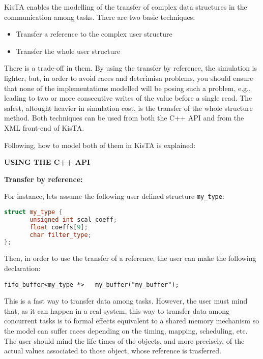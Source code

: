 KisTA enables the modelling of the transfer of complex data structures in the communication among tasks.
%
There are two basic techniques:
\begin{itemize}
\item Transfer a reference to the complex user structure
\item Transfer the whole user structure
\end{itemize}
There is a trade-off in them. By using the transfer by reference, the simulation is lighter, but, in order to
avoid races and deterimisn problems, you should ensure that none of the implementations modelled will be
posing such a problem, e.g., leading to two or more consecutive writes of the value before a single read.
%
The safest, altought heavier in simulation cost, is the transfer of the whole structure method.
%
Both techniques can be used from both the C++ API and from the XML front-end of KisTA.

Following, how to model both of them in KisTA is explained:

\textbf{USING THE C++ API}

\textbf{Transfer by reference:}

For instance, lets assume the following user defined structure \texttt{my\_type}:

\begin{lstlisting}[language=c++,caption={Example of complex data structure declared by the user.}]
struct my_type {
       unsigned int scal_coeff;
       float coeffs[9];
       char filter_type;
};
\end{lstlisting}

Then, in order to use the transfer of a reference, the user can make the following declaration:

\begin{lstlisting}[style=KistaCodeStyle,caption={Example of fifo buffer declaration to transfer a reference to a complex data structure declared by the user.},label=fif_buf_data_ref]
fifo_buffer<my_type *>   my_buffer("my_buffer");
\end{lstlisting}

This is a fast way to transfer data among tasks. However, the user must mind that, as it can happen in a real system, this way to transfer data among concurrent tasks is to formal effects equivalent to a shared memory mechanism so the model can suffer races depending on the timing, mapping, scheduling, etc. The user should mind the life times of the objects, and more precisely, of the actual values associated to those object, whose reference is trasferred.

